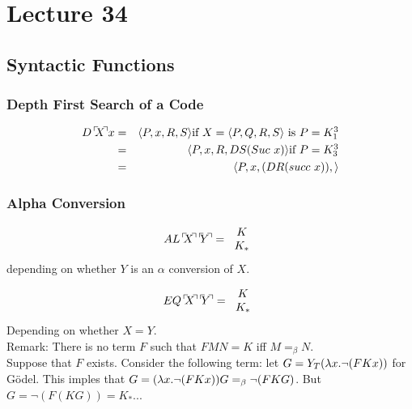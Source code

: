 \chapter{Lecture 34}
\pagestyle{fancy}

\section{Syntactic Functions}
\subsection{Depth First Search of a Code}
\begin{eqnarray*}
  D\godnum{X}x &=& \langle P,x,R,S \rangle \hbox{if $X = \langle P,Q,R,S \rangle$ is $P = K_1^3$}\\
  &=& \langle P, x, R, D S (Suc\ x) \rangle \hbox{if $P = K_3^3$}\\
  &=& \langle P, x, (DR(succ\ x)), \rangle
\end{eqnarray*}

\subsection{Alpha Conversion}
\begin{equation*}
  AL\godnum{X}\godnum{Y} = \begin{tabular}{c}$K$\\$K_*$\end{tabular}
\end{equation*}
depending on whether $Y$ is an $\alpha$ conversion of $X$.

\begin{equation*}
  EQ\godnum{X}\godnum{Y} = \begin{tabular}{c}$K$\\$K_*$\end{tabular}
\end{equation*}
Depending on whether $X = Y$.\\

Remark: There is no term $F$ such that $FMN = K$ iff $M =_\beta N$.\\

Suppose that $F$ exists. Consider the following term: let $G = Y_T(\lambda x.\lnot (FKx))$ for G\"odel. This imples that $G = (\lambda x.\lnot (FKx))G =_\beta \lnot(FKG)$. But $G = \lnot(F(KG)) = K_*$...
